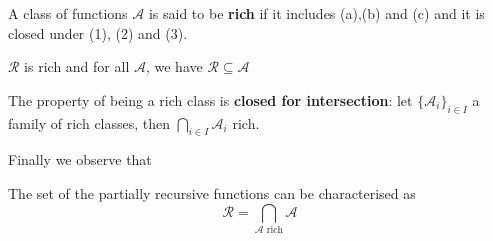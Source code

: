 \begin{definition}
    A class of functions $\mathcal{A}$ is said to be \textbf{rich} if it includes (a),(b) and (c) and it is closed under (1), (2) and (3).
\end{definition}

$\mathcal{R}$ is rich and for all $\mathcal{A}$, we have $\mathcal{R}\subseteq\mathcal{A}$

\begin{remark}
  The property of being a rich class is \textbf{closed for intersection}:
  let $\{\mathcal{A}_i\}_{i\in I}$ a family of rich classes, then $\bigcap_{i\in I}\mathcal{A}_i$ rich.
\end{remark}

Finally we observe that

\begin{proposition}
  The set of the partially recursive functions can be characterised as
\begin{equation*}
  \mathcal{R} = \bigcap_{
  \mathcal{A} \text{ rich}} \mathcal{A}
\end{equation*}
\end{proposition}


